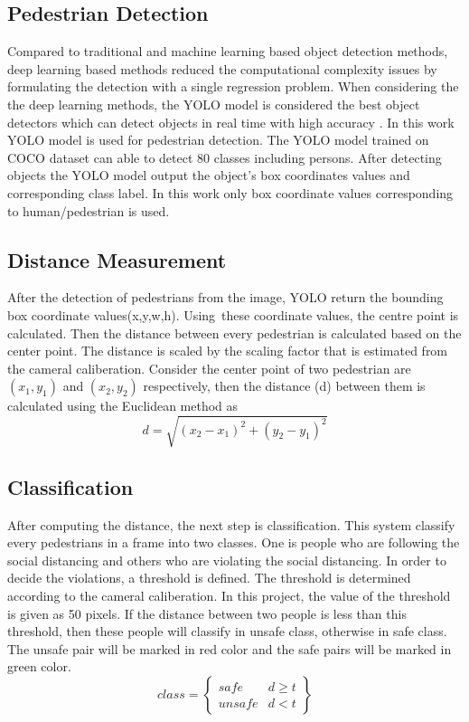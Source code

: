 \documentclass{svproc}
\begin{document}
\subsection{Pedestrian Detection}
Compared to traditional and machine learning based object detection methods, deep learning based methods reduced the computational complexity issues by formulating the detection with a single regression problem. When considering the the deep learning methods, the YOLO model is considered the best object detectors which can detect objects in real time with high accuracy \cite{yoloreal}. In this work YOLO model is used for pedestrian detection. The YOLO model trained on COCO dataset can able to detect 80 classes including persons. After detecting objects the YOLO model output the object's box coordinates values and corresponding class label. In this work only box coordinate values corresponding to human/pedestrian is used.

\subsection{Distance Measurement}
After the detection of pedestrians from the image, YOLO return the bounding box coordinate values(x,y,w,h). Using these coordinate values, the centre point is calculated. Then the distance between every pedestrian is calculated based on the center point. The distance is scaled by the scaling factor that is estimated from the cameral caliberation. Consider the center point of two pedestrian are $(x_1,y_1)$ and $(x_2,y_2)$ respectively, then the distance (d) between them is calculated using the Euclidean method as 
\begin{equation}
	d = \sqrt{(x_2-x_1)^2+(y_2-y_1)^2}
\end{equation}

\subsection{Classification}
After computing the distance, the next step is classification. This system classify every pedestrians in a frame into two classes. One is people who are following the social distancing and others who are violating the social distancing. In order to decide the violations, a threshold is defined. The threshold is determined according to the cameral caliberation. In this project, the value of the threshold is given as 50 pixels. If the distance between two people is less than this threshold, then these people will classify in unsafe class, otherwise in safe class. The unsafe pair will be marked in red color and the safe pairs will be marked in green color. 
\begin{equation}
	class = \left\{
	\begin{array}{ll}
		safe & d \ge t \\
		unsafe & d < t
	\end{array}
	\right\}
\end{equation}
\end{document}
